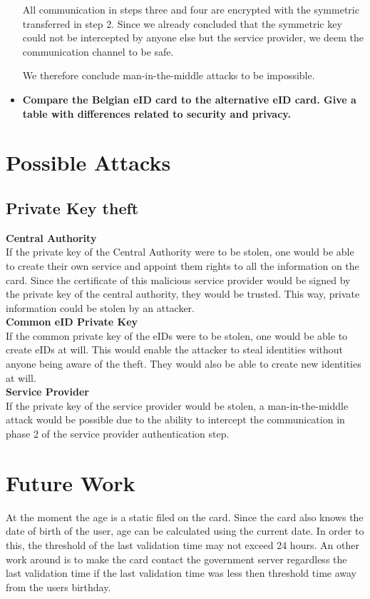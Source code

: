 \documentclass[12pt]{report}
\begin{document}
\begin{itemize}
All communication in steps three and four are encrypted with the symmetric transferred in step 2. Since we already concluded that the symmetric key could not be intercepted by anyone else but the service provider, we deem the communication channel to be safe.

We therefore conclude man-in-the-middle attacks to be impossible.

\item \textbf{Compare the Belgian eID card to the alternative eID card. Give a table with differences related to security and privacy.}\\

\end{itemize}

\section{Possible Attacks}
\subsection{Private Key theft}
\textbf{Central Authority}\\
If the private key of the Central Authority were to be stolen, one would be able to create their own service and appoint them rights to all the information on the card. Since the certificate of this malicious service provider would be signed by the private key of the central authority, they would be trusted.
This way, private information could be stolen by an attacker.\\
\textbf{Common eID Private Key}\\
If the common private key of the eIDs were to be stolen, one would be able to create eIDs at will. This would enable the attacker to steal identities without anyone being aware of the theft. They would also be able to create new identities at will.\\
\textbf{Service Provider}\\
If the private key of the service provider would be stolen, a man-in-the-middle attack would be possible due to the ability to intercept the communication in phase 2 of the service provider authentication step.

\section{Future Work}
At the moment the age is a static filed on the card. Since the card also knows the date of birth of the user, age can be calculated using the current date. In order to this, the threshold of the last validation time may not exceed 24 hours. An other work around is to make the card contact the government server regardless the last validation time if the last validation time was less then threshold time away from the users birthday.
\end{document}
